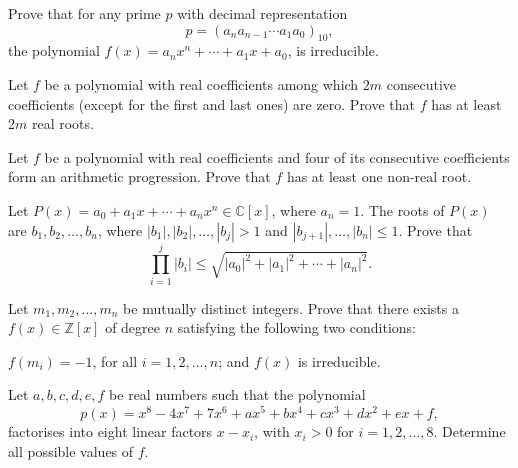 \begin{question}[name={1998 Iran}]
    Prove that for any prime $p$ with decimal representation \[p=(a_na_{n-1}\cdots a_1a_0)_{10},\] the polynomial $f(x)=a_nx^n+\cdots+a_1x+a_0$, is irreducible.
\end{question}



\begin{question}[name={1998 Iran}]
    Let $f$ be a polynomial with real coefficients among which $2m$ consecutive coefficients (except for the first and last ones) are zero. Prove that $f$ has at least $2m$ real roots.
\end{question}



\begin{question}[name={1998 Iran}]
    Let $f$ be a polynomial with real coefficients and four of its consecutive coefficients form an arithmetic progression. Prove that $f$ has at least one non-real root.
\end{question}



\begin{question}[name={1995 Taiwan}]
    Let $P(x)=a_{0}+a_{1}x+\cdots+a_{n}x^{n}\in\mathbb{C}[x]$, where $a_{n}=1$. The roots of $P(x)$ are $b_{1},b_{2},\dots,b_{n}$, where $|b_{1}|,|b_{2}|,\dots,|b_{j}|>1$ and $|b_{j+1}|,\dots,|b_{n}|\leq 1$. Prove that \[\prod_{i=1}^{j} |b_{i}| \leq \sqrt{|a_{0}|^{2}+|a_{1}|^{2}+\cdots+|a_{n}|^{2}}.\]
\end{question}



\begin{question}[name={1995 Taiwan}]
    Let $m_{1},m_{2},\dots,m_{n}$ be mutually distinct integers. Prove that there exists a $f(x)\in\mathbb{Z}[x]$ of degree $n$ satisfying the following two conditions:
    \begin{tasks}
        \task $f(m_{i})=-1$, for all $i=1,2,\dots,n$; and
        \task $f(x)$ is irreducible.
    \end{tasks}
\end{question}



\begin{question}[name={2003 APMO}]
    Let $a,b,c,d,e,f$ be real numbers such that the polynomial
    \[ p(x)=x^8-4x^7+7x^6+ax^5+bx^4+cx^3+dx^2+ex+f, \]
    factorises into eight linear factors $x-x_i$, with $x_i>0$ for $i=1,2,\dots,8$. Determine all possible values of $f$.
\end{question}



